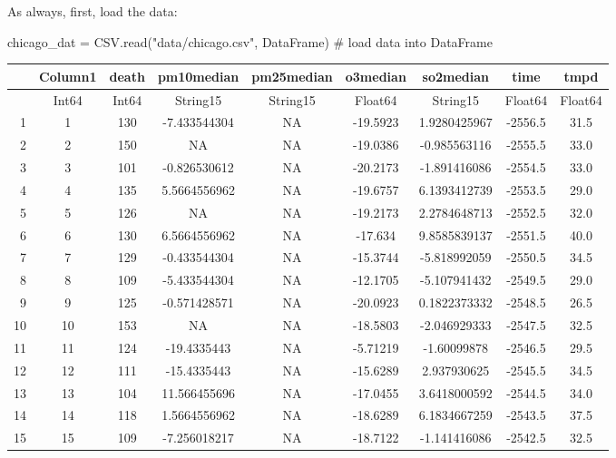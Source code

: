 \documentclass[
  letterpaper,
  DIV=11,
  numbers=noendperiod]{scrartcl}
\newenvironment{Shaded}{\begin{snugshade}}{\end{snugshade}}
\newcommand{\CommentTok}[1]{\textcolor[rgb]{0.37,0.37,0.37}{#1}}
\newcommand{\FunctionTok}[1]{\textcolor[rgb]{0.28,0.35,0.67}{#1}}
\newcommand{\NormalTok}[1]{\textcolor[rgb]{0.00,0.23,0.31}{#1}}
\newcommand{\OperatorTok}[1]{\textcolor[rgb]{0.37,0.37,0.37}{#1}}
\newcommand{\StringTok}[1]{\textcolor[rgb]{0.13,0.47,0.30}{#1}}
\begin{document}
As always, first, load the data:

\begin{Shaded}
\begin{Highlighting}[]
\NormalTok{chicago\_dat }\OperatorTok{=}\NormalTok{ CSV.}\FunctionTok{read}\NormalTok{(}\StringTok{"data/chicago.csv"}\NormalTok{, DataFrame) }\CommentTok{\# load data into DataFrame}
\end{Highlighting}
\end{Shaded}

\begin{tabular}{r|cccccccc}
    & Column1 & death & pm10median & pm25median & o3median & so2median & time & tmpd\\
    \hline
    & Int64 & Int64 & String15 & String15 & Float64 & String15 & Float64 & Float64\\
    \hline
    1 & 1 & 130 & -7.433544304 & NA & -19.5923 & 1.9280425967 & -2556.5 & 31.5 \\
    2 & 2 & 150 & NA & NA & -19.0386 & -0.985563116 & -2555.5 & 33.0 \\
    3 & 3 & 101 & -0.826530612 & NA & -20.2173 & -1.891416086 & -2554.5 & 33.0 \\
    4 & 4 & 135 & 5.5664556962 & NA & -19.6757 & 6.1393412739 & -2553.5 & 29.0 \\
    5 & 5 & 126 & NA & NA & -19.2173 & 2.2784648713 & -2552.5 & 32.0 \\
    6 & 6 & 130 & 6.5664556962 & NA & -17.634 & 9.8585839137 & -2551.5 & 40.0 \\
    7 & 7 & 129 & -0.433544304 & NA & -15.3744 & -5.818992059 & -2550.5 & 34.5 \\
    8 & 8 & 109 & -5.433544304 & NA & -12.1705 & -5.107941432 & -2549.5 & 29.0 \\
    9 & 9 & 125 & -0.571428571 & NA & -20.0923 & 0.1822373332 & -2548.5 & 26.5 \\
    10 & 10 & 153 & NA & NA & -18.5803 & -2.046929333 & -2547.5 & 32.5 \\
    11 & 11 & 124 & -19.4335443 & NA & -5.71219 & -1.60099878 & -2546.5 & 29.5 \\
    12 & 12 & 111 & -15.4335443 & NA & -15.6289 & 2.937930625 & -2545.5 & 34.5 \\
    13 & 13 & 104 & 11.566455696 & NA & -17.0455 & 3.6418000592 & -2544.5 & 34.0 \\
    14 & 14 & 118 & 1.5664556962 & NA & -18.6289 & 6.1834667259 & -2543.5 & 37.5 \\
    15 & 15 & 109 & -7.256018217 & NA & -18.7122 & -1.141416086 & -2542.5 & 32.5 \\

\end{tabular}
\end{document}
